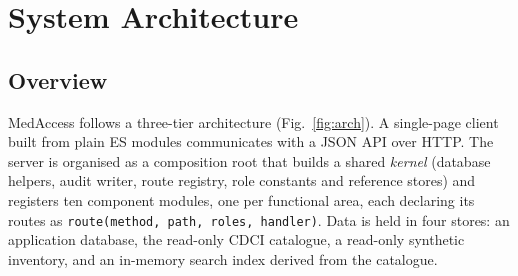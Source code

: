 \documentclass[conference]{IEEEtran}
\begin{document}
\section{System Architecture}\label{sec:arch}

\subsection{Overview}
MedAccess follows a three-tier architecture (Fig.~\ref{fig:arch}). A single-page client built from plain ES modules communicates with a JSON API over HTTP. The server is organised as a composition root that builds a shared \emph{kernel} (database helpers, audit writer, route registry, role constants and reference stores) and registers ten component modules, one per functional area, each declaring its routes as \texttt{route(method, path, roles, handler)}. Data is held in four stores: an application database, the read-only CDCI catalogue, a read-only synthetic inventory, and an in-memory search index derived from the catalogue.
\end{document}
